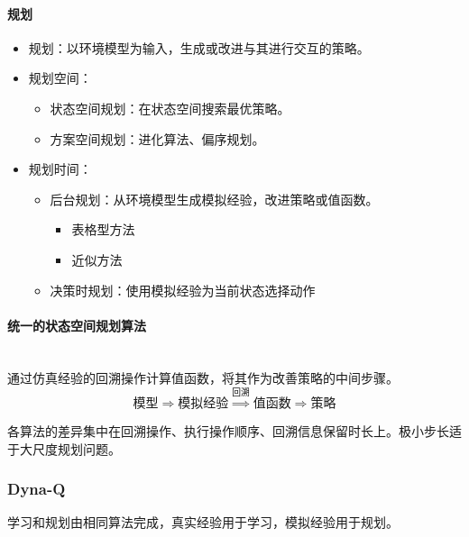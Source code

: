 \documentclass[
12pt, %
a4paper, 
oneside, %
headinclude,footinclude, %
]{scrartcl}
\begin{document}
\paragraph{规划}
\begin{itemize}
\item 规划：以环境模型为输入，生成或改进与其进行交互的策略。
\item 规划空间：
\begin{itemize}
\item 状态空间规划：在状态空间搜索最优策略。
\item 方案空间规划：进化算法、偏序规划。
\end{itemize}
\item 规划时间：
\begin{itemize}
\item 后台规划：从环境模型生成模拟经验，改进策略或值函数。
\begin{itemize}
\item 表格型方法
\item 近似方法
\end{itemize}
\item 决策时规划：使用模拟经验为当前状态选择动作
\end{itemize}
\end{itemize}
\paragraph{统一的状态空间规划算法}~\\

通过仿真经验的回溯操作计算值函数，将其作为改善策略的中间步骤。
$$ \text{模型} \Longrightarrow \text{模拟经验} \overset{\text{回溯}}{\Longrightarrow} \text{值函数} \Longrightarrow \text{策略} $$

各算法的差异集中在回溯操作、执行操作顺序、回溯信息保留时长上。极小步长适于大尺度规划问题。
\subsubsection{Dyna-Q}
学习和规划由相同算法完成，真实经验用于学习，模拟经验用于规划。
\end{document}
